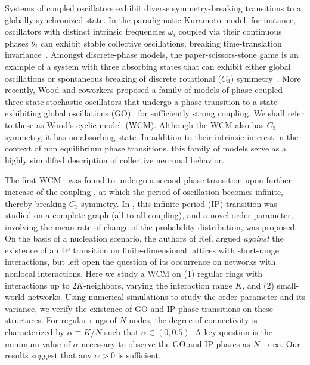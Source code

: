 Systems of coupled oscillators exhibit diverse symmetry-breaking transitions to a globally synchronized state. In the paradigmatic
Kuramoto model, for instance, oscillators with distinct intrinsic frequencies $\omega_i$ coupled via their continuous phases $\theta_i$
can exhibit stable collective oscillations, breaking time-translation
invariance~\cite{Kuramoto84,Strogatz93,Strogatz00,StrogatzSync,Pikovsky01}.  Amongst discrete-phase models, the paper-scissors-stone
game is an example of a system with three absorbing states that can exhibit either global oscillations or spontaneous breaking of
discrete rotational ($C_3$) symmetry~\cite{Tainaka88,Tainaka89,Tainaka91,Itoh94,Tainaka94}. More recently, Wood and coworkers proposed
a family of models of phase-coupled three-state stochastic oscillators that undergo a phase transition to a state exhibiting global
oscillations (GO)~\cite{Wood06a,Wood06b,Wood07a,Wood07b} for sufficiently strong coupling.  We shall refer to these as Wood's cyclic
model~(WCM). Although the WCM also has $C_3$ symmetry, it has no absorbing state.  In addition to their intrinsic interest in the
context of non equilibrium phase transitions, this family of models serve as a highly simplified description of collective neuronal
behavior.


The first WCM~\cite{Wood06a} was found to undergo a second phase transition upon further increase of the coupling
\cite{assis2011infinite}, at which the period of oscillation becomes infinite, thereby breaking $C_3$ symmetry. In
\cite{assis2011infinite}, this infinite-period (IP) transition was studied on a complete graph (all-to-all coupling), and a novel order
parameter, involving the mean rate of change of the probability distribution, was proposed. On the basis of a nucleation scenario, the
authors of Ref. \cite{assis2011infinite} argued \textit{against} the existence of an IP transition on finite-dimensional lattices with
short-range interactions, but left open the question of its occurrence on networks with nonlocal interactions. Here we study a WCM on
(1) regular rings with interactions up to $2K$-neighbors, varying the interaction range $K$, and (2) small-world networks. Using
numerical simulations to study the order parameter and its variance, we verify the existence of GO and IP phase transitions on these
structures. For regular rings of $N$ nodes, the degree of connectivity is characterized by $\alpha \equiv K/N$ such that $\alpha \in
(0, 0.5)$.  A key question is the minimum value of $\alpha$ necessary to observe the GO and IP phases as $N \to \infty$.  Our results
suggest that any $\alpha > 0$ is sufficient.

